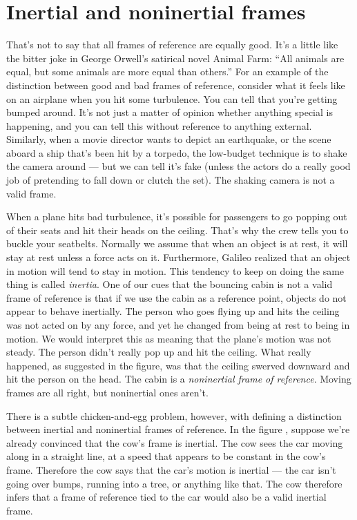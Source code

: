 \vfill\pagebreak

\section{Inertial and noninertial frames}

That's not to say that all frames of reference are equally good. It's a little like the bitter joke
in George Orwell's satirical novel Animal Farm: ``All animals are equal, but some animals are more equal than others.''
For an example of the distinction between good and bad frames of reference, consider what it feels like on
an airplane when you hit some turbulence. You can tell that you're getting bumped around. It's not just
a matter of opinion whether anything special is happening, and you can tell this without reference to anything
external. Similarly, when a movie director wants to depict an earthquake, or the scene aboard a ship that's
been hit by a torpedo, the low-budget technique is to shake the camera around --- but we can tell it's fake
(unless the actors do a really good job of pretending to fall down or clutch the set). The shaking camera is
not a valid frame.

\begin{figure}[h]\label{fig:plane-noninertial}
\end{figure}

When a plane hits bad turbulence, it's possible for passengers to go popping out of their seats and hit their
heads on the ceiling. That's why the crew tells you to buckle your seatbelts. Normally we assume that when an
object is at rest, it will stay at rest unless a force acts on it. Furthermore, Galileo realized that
an object in motion will tend
to stay in motion. This tendency to keep on doing the same thing is called \emph{inertia}.
One of our cues that the bouncing cabin is not a valid frame of reference is that if we use the cabin as a
reference point, objects do not appear to behave inertially. The person who goes flying up and hits the ceiling
was not acted on by any force, and yet he changed from being at rest to being in motion. We would interpret this
as meaning that the plane's motion was not steady. The person didn't really pop up and hit the ceiling. What really
happened, as suggested in the figure, was that the ceiling swerved downward and hit the person on the head. The cabin is a \emph{noninertial frame
of reference}. Moving frames are all right, but noninertial ones aren't.

There is a subtle chicken-and-egg problem, however, with defining a distinction between inertial and noninertial
frames of reference. In the figure , suppose we're already convinced that the cow's
frame is inertial. The cow sees the car moving along in a straight line, at a speed that appears to be constant
in the cow's frame. Therefore the cow says that the car's motion is inertial --- the car isn't going over bumps,
running into a tree, or anything like that. The cow therefore infers that a frame of reference tied to the car
would also be a valid inertial frame.


